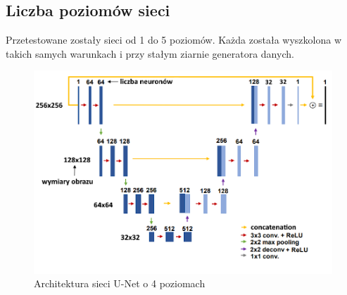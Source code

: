 \documentclass[a4paper, 12pt]{article}
\begin{document}
\subsection{Liczba poziomów sieci}
Przetestowane zostały sieci od 1 do 5 poziomów. Każda została wyszkolona w takich samych warunkach i przy stałym ziarnie generatora danych.
\begin{figure}[h!]
\begin{center}
	\includegraphics[width=0.9\columnwidth]{unet4.png}
	\caption{Architektura sieci U-Net o 4 poziomach}
\end{center}
\end{figure}
\newpage
{}
\end{document}
